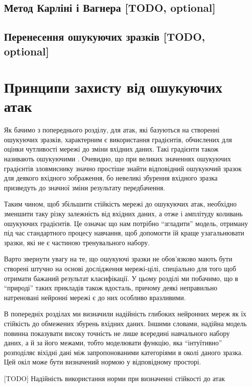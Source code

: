 \documentclass[14pt,a4paper]{extarticle}
\newcounter{e}
\numberwithin{equation}{section}
\numberwithin{figure}{section}
\begin{document}
 \subsection{Метод Карліні і Вагнера [TODO, optional]}
 \subsection{Перенесення ошукуючих зразків [TODO, optional]}
 
 \newpage
 \thispagestyle{empty}
 \section{Принципи захисту від ошукуючих атак}
 
 Як бачимо з попереднього розділу, для атак, які базуються на створенні ошукуючих зразків, характерним є використання градієнтів, обчислених для оцінки чутливості мережі до зміни вхідних даних. Такі градієнти також називають ошукуючими \cite{defencive-distillation}. Очевидно, що при великих значеннях ошукуючих градієнтів зловмиснику значно простіше знайти відповідний ошукуючий зразок для деякого вхідного зображення, бо невеликі збурення вхідного зразка призведуть до значної зміни результату передбачення.
 
 Таким чином, щоб збільшити стійкість мережі до ошукуючих атак, необхідно зменшити таку різку залежність від вхідних даних, а отже і амплітуду коливань ошукуючих градієнтів. Це означає що нам потрібно ``згладити'' модель, отриману під час стандартного процесу навчання, щоб допомогти їй краще узагальнювати зразки, які не є частиною тренувального набору.
 
 Варто звернути увагу на те, що ошукуючі зразки не обов'язково мають бути створені штучно на основі дослідження мережі-цілі, спеціально для того щоб отримати бажаний результат класифікації. У цьому розділі ми побачимо, що в ``природі'' таких прикладів також вдосталь, причому деякі неправильно натреновані нейронні мережі є до них особливо вразливими. 
 
 В попередніх розділах ми визначили надійність глибоких нейронних мереж як їх стійкість до обмежених збурень вхідних даних. Іншими словами, надійна модель повинна показувати високу точність не лише всередині навчального набору даних, а й за його межами, тобто моделювати функцію, яка ``інтуїтивно'' розподіляє віхідні дані між запропонованими категоріями в околі даного зразка. Цей окіл може бути визначений нормою у відповідному просторі.

 [TODO]
 \cite{analysis-of-robustness}
 Надійність використання норми при визначенні стійкості до атак 
\end{document}
